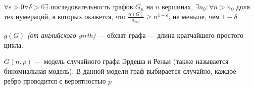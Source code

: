 

\begin{theorem}[Кучера]
    \(\forall \epsilon > 0 \forall \delta > 0 \exists \) последовательность графов \(G_n\) на \(n\) вершинах, \(\exists n_0: \forall n > n_0\) доля тех нумераций, в которых окажется, что \(\frac{\alpha(G)}{\alpha_{\text{ж}, \sigma}} \ge n^{1 - \epsilon}\), не меньше, чем \(1 - \delta\).
\end{theorem}

\begin{definition}
    \(g(G)\) \textit{(от английского girth)} --- обхват графа --- длина кратчайшего простого цикла.
\end{definition}

\begin{definition}
    \(G(n, p)\) --- модель случайного графа Эрдеша и Реньи (также называется биномиальная модель). В данной модели граф выбирается случайно, каждое ребро проводится с вероятностью \(p\)
\end{definition}

